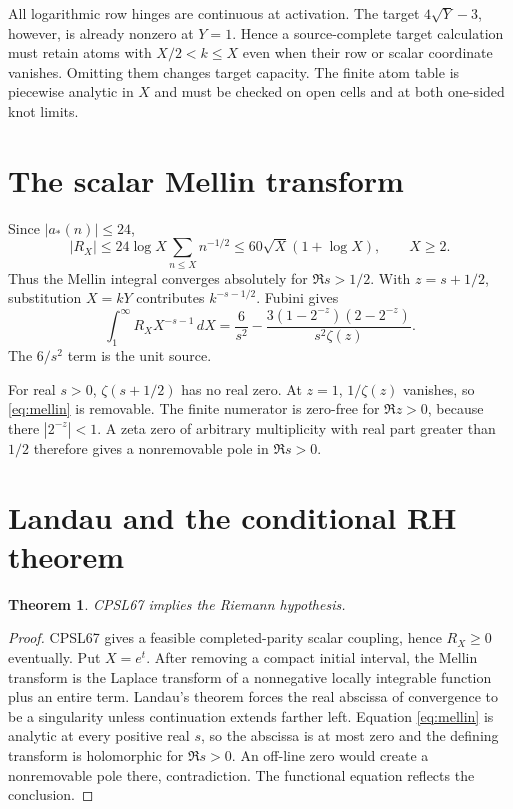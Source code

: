 \documentclass[11pt]{article}
\newtheorem{theorem}{Theorem}[section]
\newcommand{\1}{\mathbf 1}
\begin{document}
All logarithmic row hinges are continuous at activation. The target $4\sqrt Y-3$, however, is already nonzero at $Y=1$. Hence a source-complete target calculation must retain atoms with $X/2<k\le X$ even when their row or scalar coordinate vanishes. Omitting them changes target capacity. The finite atom table is piecewise analytic in $X$ and must be checked on open cells and at both one-sided knot limits.

\section{The scalar Mellin transform}

Since $|a_*(n)|\le24$,
\[
 |R_X|\le24\log X\sum_{n\le X}n^{-1/2}
 \le60\sqrt X(1+\log X),\qquad X\ge2.
\]
Thus the Mellin integral converges absolutely for $\Re s>1/2$. With $z=s+1/2$, substitution $X=kY$ contributes $k^{-s-1/2}$. Fubini gives
\begin{equation}\label{eq:mellin}
\int_1^\infty R_X X^{-s-1}\,dX
=\frac6{s^2}-\frac{3(1-2^{-z})(2-2^{-z})}{s^2\zeta(z)}.
\end{equation}
The $6/s^2$ term is the unit source.

For real $s>0$, $\zeta(s+1/2)$ has no real zero. At $z=1$, $1/\zeta(z)$ vanishes, so \eqref{eq:mellin} is removable. The finite numerator is zero-free for $\Re z>0$, because there $|2^{-z}|<1$. A zeta zero of arbitrary multiplicity with real part greater than $1/2$ therefore gives a nonremovable pole in $\Re s>0$.

\section{Landau and the conditional RH theorem}

\begin{theorem}\label{thm:conditional}
CPSL67 implies the Riemann hypothesis.
\end{theorem}
\begin{proof}
CPSL67 gives a feasible completed-parity scalar coupling, hence $R_X\ge0$ eventually. Put $X=e^t$. After removing a compact initial interval, the Mellin transform is the Laplace transform of a nonnegative locally integrable function plus an entire term. Landau's theorem forces the real abscissa of convergence to be a singularity unless continuation extends farther left. Equation \eqref{eq:mellin} is analytic at every positive real $s$, so the abscissa is at most zero and the defining transform is holomorphic for $\Re s>0$. An off-line zero would create a nonremovable pole there, contradiction. The functional equation reflects the conclusion.
\end{proof}
\end{document}
